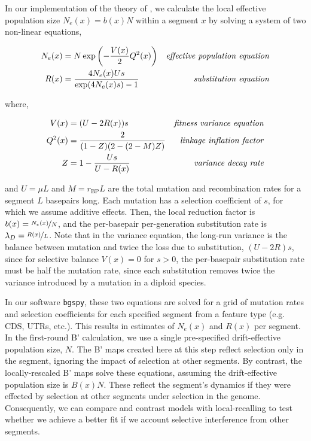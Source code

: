 \documentclass[11pt]{article}
\begin{document}
In our implementation of the theory of \textcite{Santiago2016-mu}, we calculate
the local effective population size $N_e(x) = b(x) N$ within a segment $x$ by
solving a system of two non-linear equations, 

\begin{align}
  \label{eq:}
  {N}_{e}(x) &= N \exp \left( -\frac{V(x)}{2} Q^2(x) \right) & \text{\emph{effective population equation}} \\
  {R}(x) &= \frac{4N_e(x)U s}{\exp(4 N_e(x) s)-1}  & \text{\emph{substitution equation}} 
\end{align}

where,

\begin{align}
  V(x) &= (U  - 2 {R}(x)) s & \text{\emph{fitness variance equation}} \\
  Q^2(x) &= \frac{2}{(1-Z)(2-(2-M)Z)} & \text{\emph{linkage inflation factor}} \\
  Z &= 1 - \frac{Us}{U-{R(x)}} & \text{\emph{}} \text{\emph{variance decay rate}}
\end{align}

and $U = \mu L$ and $M = r_\text{BP} L$ are the total mutation and
recombination rates for a segment $L$ basepairs long. Each mutation has a
selection coefficient of $s$, for which we assume additive effects. Then, the
local reduction factor is $b(x) = \nicefrac{N_e(x)}{N}$, and the per-basepair
per-generation substitution rate is $\lambda_D = \nicefrac{R(x)}{L}$. Note that
in the variance equation, the long-run variance is the balance between mutation
and twice the loss due to substitution, $(U-2R)s$, since for selective balance
$V(x) = 0$ for $s>0$, the per-basepair substitution rate must be half the mutation rate,
since each substitution removes twice the variance introduced by a mutation in
a diploid species.

In our software \texttt{bgspy}, these two equations are solved for a grid of
mutation rates and selection coefficients for each specified segment from a
feature type (e.g. CDS, UTRs, etc.). This results in estimates of $N_e(x)$ and
$R(x)$ per segment. In the first-round B' calculation, we use a single
pre-specified drift-effective population size, $N$. The B' maps created here at
this step reflect selection only in the segment, ignoring the impact of
selection at other segments. By contrast, the locally-rescaled B' maps solve
these equations, assuming the drift-effective population size is $B(x)N$. These
reflect the segment's dynamics if they were effected by selection at other
segments under selection in the genome. Consequently, we can compare and
contrast models with local-recalling to test whether we achieve a better fit if
we account selective interference from other segments.
\end{document}
